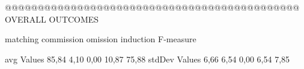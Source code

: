  @@@@@@@@@@@@@@@@@@@@@@@@@@@@@@@@@@@@@@@@@@@@@ OVERALL OUTCOMES

                matching commission   omission  induction  F-measure
      
avg Values      85,84      4,10       0,00      10,87    75,88      
stdDev Values    6,66       6,54       0,00       6,54     7,85       
